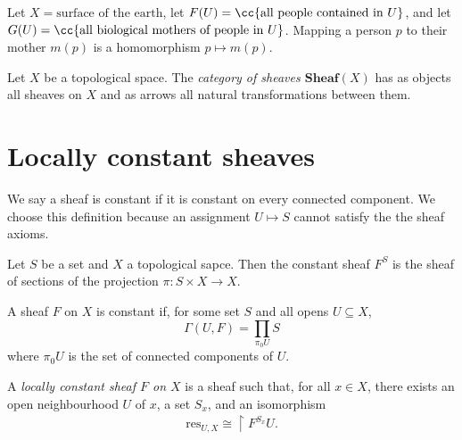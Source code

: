 \documentclass{article}
\begin{document}
\begin{example}
  Let $X = \text{surface of the earth}$, let $F(U) = \cc{\text{all people contained in } U}$,
  and let $G(U) = \cc{\text{all biological mothers of people in } U}$.
  Mapping a person $p$ to their mother $m(p)$ is a homomorphism $p \mapsto m(p)$.
\end{example}

\begin{definition}
  Let $X$ be a topological space. The \emph{category of sheaves $\textbf{Sheaf}(X)$}
  has as objects all sheaves on $X$ and as arrows all natural transformations between
  them.
\end{definition}

\section{Locally constant sheaves}\label{sec:locally_constant_sheaves}

We say a sheaf is constant if it is constant on every connected component. We choose this
definition because an assignment $U\mapsto S$ cannot satisfy the the sheaf axioms.

\begin{definition}
  Let $S$ be a set and $X$ a topological sapce. Then
  the constant sheaf $F^S$ is the sheaf of sections
  of the projection $\pi:S\times X\to X$.
\end{definition}


\begin{definition}
  A sheaf $F$ on $X$ is constant if, for some set $S$ and all opens $U\subseteq X$,
  \begin{equation}
    \Gamma(U,F) = \prod_{\pi_0U}S
  \end{equation}
  where $\pi_0U$ is the set of connected components of $U$.
\end{definition}

\begin{definition}
  A \emph{locally constant sheaf $F$ on $X$} is a sheaf such that,
  for all $x\in X$, there exists an open neighbourhood $U$ of $x$,
  a set $S_x$, and an isomorphism
  \begin{align*}
    \text{res}_{U,X} \cong \restriction{F^{S_x}}{U}.
  \end{align*}
\end{definition}
\end{document}
